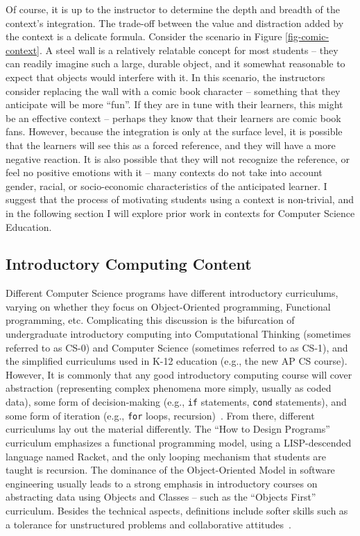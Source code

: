 Of course, it is up to the instructor to determine the depth and breadth of the context's integration.
The trade-off between the value and distraction added by the context is a delicate formula.
Consider the scenario in Figure \ref{fig-comic-context}.
A steel wall is a relatively relatable concept for most students -- they can readily imagine such a large, durable object, and it somewhat reasonable to expect that objects would interfere with it.
In this scenario, the instructors consider replacing the wall with a comic book character -- something that they anticipate will be more ``fun''.
If they are in tune with their learners, this might be an effective context -- perhaps they know that their learners are comic book fans.
However, because the integration is only at the surface level, it is possible that the learners will see this as a forced reference, and they will have a more negative reaction.
It is also possible that they will not recognize the reference, or feel no positive emotions with it -- many contexts do not take into account gender, racial, or socio-economic characteristics of the anticipated learner.
I suggest that the process of motivating students using a context is non-trivial, and in the following section I will explore prior work in contexts for Computer Science Education.

\subsection{Introductory Computing Content}

Different Computer Science programs have different introductory curriculums, varying on whether they focus on Object-Oriented programming, Functional programming, etc. 
Complicating this discussion is the bifurcation of undergraduate introductory computing into Computational Thinking (sometimes referred to as CS-0) and Computer Science (sometimes referred to as CS-1), and the simplified curriculums used in K-12 education (e.g., the new AP CS course).
However, It is commonly that any good introductory computing course will cover abstraction (representing complex phenomena more simply, usually as coded data), some form of decision-making (e.g., \texttt{if} statements, \texttt{cond} statements), and some form of iteration (e.g., \texttt{for} loops, recursion)~\cite{Kramer:2007, CS2013, csta-computational-thinking}.
From there, different curriculums lay out the material differently.
The ``How to Design Programs'' curriculum emphasizes a functional programming model, using a LISP-descended language named Racket, and the only looping mechanism that students are taught is recursion.
The dominance of the Object-Oriented Model in software engineering usually leads to a strong emphasis in introductory courses on abstracting data using Objects and Classes -- such as the ``Objects First'' curriculum.
Besides the technical aspects, definitions include softer skills such as a tolerance for unstructured problems and collaborative attitudes~\cite{csta-computational-thinking, google-computational-thinking}.

